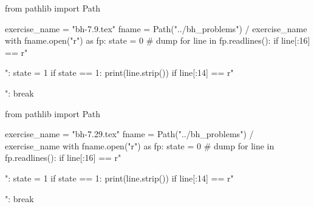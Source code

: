 \begin{pycode}
from pathlib import Path

exercise_name = "bh-7.9.tex"
fname = Path("../bh_problems") / exercise_name
with fname.open("r") as fp:
    state = 0  # dump
    for line in fp.readlines():
        if line[:16] == r"\begin{exercise}":
            state = 1
        if state == 1:
            print(line.strip())
        if line[:14] == r"\end{exercise}":
            break
\end{pycode}

\begin{pycode}
from pathlib import Path

exercise_name = "bh-7.29.tex"
fname = Path("../bh_problems") / exercise_name
with fname.open("r") as fp:
    state = 0  # dump
    for line in fp.readlines():
        if line[:16] == r"\begin{exercise}":
            state = 1
        if state == 1:
            print(line.strip())
        if line[:14] == r"\end{exercise}":
            break
\end{pycode}


